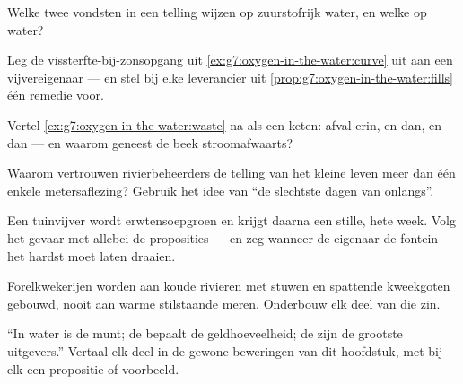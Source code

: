 \begin{exercise}[$\star$]\label{exo:g7:oxygen-in-the-water:6}
Welke twee vondsten in een telling wijzen op zuurstofrijk water, en welke
op  water?
\end{exercise}

\begin{exercise}[$\star\star$]\label{exo:g7:oxygen-in-the-water:7}
Leg de vissterfte-bij-zonsopgang uit
\cref{ex:g7:oxygen-in-the-water:curve} uit aan een vijvereigenaar --- en
stel bij elke leverancier uit
\cref{prop:g7:oxygen-in-the-water:fills} één remedie voor.
\end{exercise}

\begin{exercise}[$\star\star$]\label{exo:g7:oxygen-in-the-water:8}
Vertel \cref{ex:g7:oxygen-in-the-water:waste} na als een keten: afval
erin, en dan, en dan --- en waarom geneest de beek stroomafwaarts?
\end{exercise}

\begin{exercise}[$\star\star$]\label{exo:g7:oxygen-in-the-water:9}
Waarom vertrouwen rivierbeheerders de telling van het kleine leven meer
dan één enkele metersaflezing? Gebruik het idee van ``de slechtste dagen
van onlangs''.
\end{exercise}

\begin{exercise}[$\star\star$]\label{exo:g7:oxygen-in-the-water:10}
Een tuinvijver wordt erwtensoepgroen en krijgt daarna een stille, hete
week. Volg het gevaar met allebei de proposities --- en zeg wanneer de
eigenaar de fontein het hardst moet laten draaien.
\end{exercise}

\begin{exercise}[$\star\star$]\label{exo:g7:oxygen-in-the-water:11}
Forelkwekerijen worden aan koude rivieren met stuwen en spattende
kweekgoten gebouwd, nooit aan warme stilstaande meren. Onderbouw elk deel
van die zin.
\end{exercise}

\begin{exercise}[$\star\star\star$]\label{exo:g7:oxygen-in-the-water:12}
``In water is  de munt; de  bepaalt de geldhoeveelheid;
de  zijn de grootste uitgevers.'' Vertaal elk deel in de gewone
beweringen van dit hoofdstuk, met bij elk een propositie of voorbeeld.
\end{exercise}

